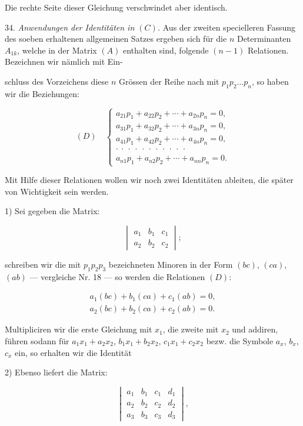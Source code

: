 Die rechte Seite dieser Gleichung verschwindet aber identisch.

34. \textit{Anwendungen der Identitäten in $(C)$.} Aus der zweiten
specielleren Fassung des soeben erhaltenen allgemeinen Satzes ergeben
sich für die $n$ Determinanten $A_{1k}$, welche in der Matrix $(A)$
enthalten sind, folgende $(n-1)$ Relationen. Bezeichnen wir nämlich mit
Ein-


schluss des Vorzeichens diese $n$ Grössen der Reihe nach mit $p_1p_2\ldots
p_n$, so haben wir die Beziehungen:

\[
(D)\quad
\begin{cases}
a_{21}p_1+a_{22}p_2+\cdots+a_{2n}p_n=0,\\
a_{31}p_1+a_{32}p_2+\cdots+a_{3n}p_n=0,\\
a_{41}p_1+a_{42}p_2+\cdots+a_{4n}p_n=0,\\
\cdot\ \cdot\ \cdot\ \cdot\ \cdot\ \cdot\ \cdot\ \cdot\ \cdot\ \cdot\ \cdot\\
a_{n1}p_1+a_{n2}p_2+\cdots+a_{nn}p_n=0.
\end{cases}
\]

Mit Hilfe dieser Relationen wollen wir noch zwei Identitäten ableiten,
die später von Wichtigkeit sein werden.

1) Sei gegeben die Matrix:

\[
\begin{vmatrix}
a_1 & b_1 & c_1 \\
a_2 & b_2 & c_2
\end{vmatrix};
\]

schreiben wir die mit $p_1p_2p_3$ bezeichneten Minoren in der Form
$(bc)$, $(ca)$, $(ab)$ --- vergleiche Nr. 18 --- so werden die Relationen
$(D)$:

\[
\begin{gathered}
a_1(bc)+b_1(ca)+c_1(ab)=0,\\
a_2(bc)+b_2(ca)+c_2(ab)=0.
\end{gathered}
\]

Multipliciren wir die erste Gleichung mit $x_1$, die zweite mit $x_2$ und
addiren, führen sodann für $a_1x_1+a_2x_2$, $b_1x_1+b_2x_2$,
$c_1x_1+c_2x_2$ bezw. die Symbole $a_x$, $b_x$, $c_x$ ein, so erhalten
wir die Identität


2) Ebenso liefert die Matrix:

\[
\begin{vmatrix}
a_1 & b_1 & c_1 & d_1 \\
a_2 & b_2 & c_2 & d_2 \\
a_3 & b_3 & c_3 & d_3
\end{vmatrix},
\]

